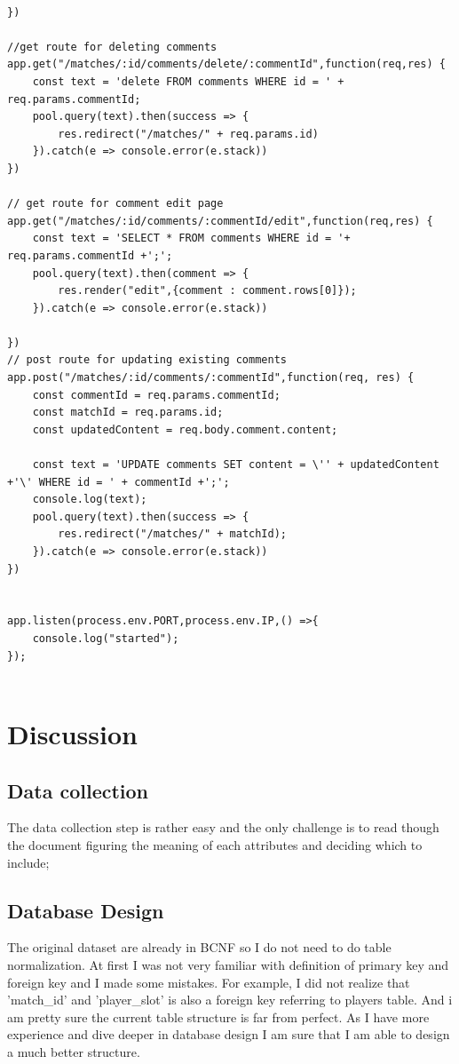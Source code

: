 \documentclass[a4paper]{article}
\begin{document}
\begin{lstlisting}
    
})

//get route for deleting comments
app.get("/matches/:id/comments/delete/:commentId",function(req,res) {
    const text = 'delete FROM comments WHERE id = ' + req.params.commentId;
    pool.query(text).then(success => {
        res.redirect("/matches/" + req.params.id)
    }).catch(e => console.error(e.stack))
}) 

// get route for comment edit page
app.get("/matches/:id/comments/:commentId/edit",function(req,res) {
    const text = 'SELECT * FROM comments WHERE id = '+ req.params.commentId +';';
    pool.query(text).then(comment => {
        res.render("edit",{comment : comment.rows[0]});
    }).catch(e => console.error(e.stack))

})
// post route for updating existing comments
app.post("/matches/:id/comments/:commentId",function(req, res) {
    const commentId = req.params.commentId;
    const matchId = req.params.id;
    const updatedContent = req.body.comment.content;

    const text = 'UPDATE comments SET content = \'' + updatedContent +'\' WHERE id = ' + commentId +';';
    console.log(text);
    pool.query(text).then(success => {
        res.redirect("/matches/" + matchId);
    }).catch(e => console.error(e.stack))
})


app.listen(process.env.PORT,process.env.IP,() =>{
    console.log("started");
});


\end{lstlisting}
\section{Discussion}
\subsection{Data collection}
The data collection step is rather easy and the only challenge is to read though the document figuring the meaning of each attributes and deciding which to include;
\subsection{Database Design}
The original dataset are already in BCNF so I do not need to do table normalization. At first I was not very familiar with definition of primary key and foreign key and I made some mistakes. For example, I did not realize that 'match\_id' and 'player\_slot' is also a foreign key referring to players table. And i am pretty sure the current table structure is far from perfect. As I have more experience and dive deeper in database design I am sure that I am able to design a much better structure.
\end{document}
